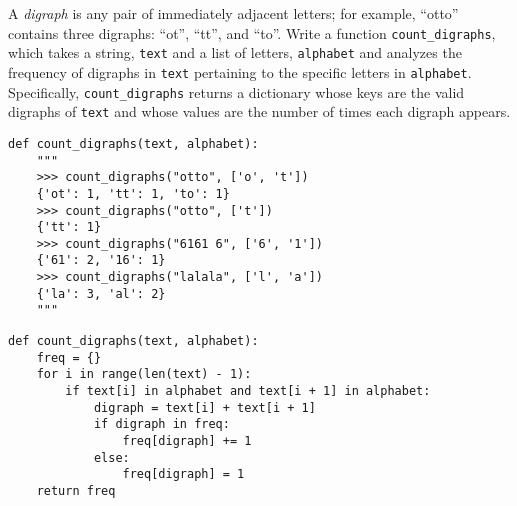 \begin{blocksection}
\question A \textit{digraph} is any pair of immediately adjacent letters; for example, ``otto'' contains three digraphs: ``ot'', ``tt'', and ``to''. Write a function \lstinline{count_digraphs}, which takes a string, \lstinline{text} and a list of letters, \lstinline{alphabet} and analyzes the frequency of digraphs in \lstinline{text} pertaining to the specific letters in \lstinline{alphabet}. Specifically, \lstinline{count_digraphs} returns a dictionary whose keys are the valid digraphs of \lstinline{text} and whose values are the number of times each digraph appears.

\begin{lstlisting}
def count_digraphs(text, alphabet):
    """
    >>> count_digraphs("otto", ['o', 't'])
    {'ot': 1, 'tt': 1, 'to': 1}
    >>> count_digraphs("otto", ['t'])
    {'tt': 1}
    >>> count_digraphs("6161 6", ['6', '1'])
    {'61': 2, '16': 1}
    >>> count_digraphs("lalala", ['l', 'a'])
    {'la': 3, 'al': 2}
    """
\end{lstlisting}
\end{blocksection}


\begin{solution}
\begin{lstlisting}
def count_digraphs(text, alphabet):
    freq = {}
    for i in range(len(text) - 1):
        if text[i] in alphabet and text[i + 1] in alphabet:
            digraph = text[i] + text[i + 1]
            if digraph in freq:
                freq[digraph] += 1
            else: 
                freq[digraph] = 1
    return freq
\end{lstlisting}
\end{solution}

